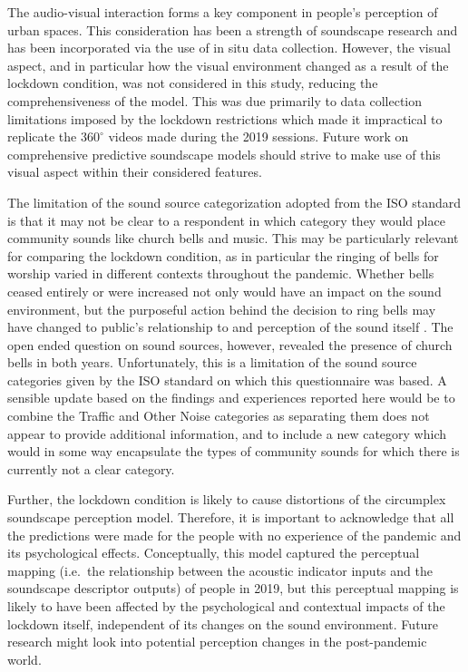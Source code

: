 \documentclass[
  authoryear,
  preprint,
  3p,
  onecolumn]{elsarticle}
\begin{document}
The audio-visual interaction forms a key component in people's
perception of urban spaces. This consideration has been a strength of
soundscape research and has been incorporated via the use of in situ
data collection. However, the visual aspect, and in particular how the
visual environment changed as a result of the lockdown condition, was
not considered in this study, reducing the comprehensiveness of the
model. This was due primarily to data collection limitations imposed by
the lockdown restrictions which made it impractical to replicate the
\(360^{\circ}\) videos made during the 2019 sessions. Future work on
comprehensive predictive soundscape models should strive to make use of
this visual aspect within their considered features.

The limitation of the sound source categorization adopted from the ISO
standard is that it may not be clear to a respondent in which category
they would place community sounds like church bells and music. This may
be particularly relevant for comparing the lockdown condition, as in
particular the ringing of bells for worship varied in different contexts
throughout the pandemic. Whether bells ceased entirely or were increased
not only would have an impact on the sound environment, but the
purposeful action behind the decision to ring bells may have changed to
public's relationship to and perception of the sound itself
\citep{Parker2020Anthropause}. The open ended question on sound sources,
however, revealed the presence of church bells in both years.
Unfortunately, this is a limitation of the sound source categories given
by the ISO standard on which this questionnaire was based. A sensible
update based on the findings and experiences reported here would be to
combine the Traffic and Other Noise categories as separating them does
not appear to provide additional information, and to include a new
category which would in some way encapsulate the types of community
sounds for which there is currently not a clear category.

Further, the lockdown condition is likely to cause distortions of the
circumplex soundscape perception model. Therefore, it is important to
acknowledge that all the predictions were made for the people with no
experience of the pandemic and its psychological effects. Conceptually,
this model captured the perceptual mapping (i.e.~the relationship
between the acoustic indicator inputs and the soundscape descriptor
outputs) of people in 2019, but this perceptual mapping is likely to
have been affected by the psychological and contextual impacts of the
lockdown itself, independent of its changes on the sound environment.
Future research might look into potential perception changes in the
post-pandemic world.
\end{document}
